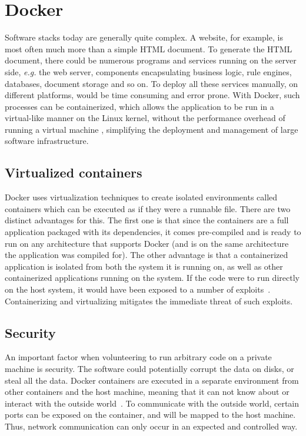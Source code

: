 \section{Docker}
Software stacks today are generally quite complex. A website, for example, is most often much more than a simple HTML document. To generate the HTML document, there could be numerous programs and services running on the server side, \textit{e.g.} the web server, components encapsulating business logic, rule engines, databases, document storage and so on. To deploy all these services manually, on different platforms, would be time consuming and error prone. With Docker, such processes can be containerized, which allows the application to be run in a virtual-like manner on the Linux kernel, without the performance overhead of running a virtual machine \cite{docker-about}, simplifying the deployment and management of large software infrastructure.

\subsection{Virtualized containers}
Docker uses virtualization techniques to create isolated environments called containers which can be executed as if they were a runnable file. There are two distinct advantages for this. The first one is that since the containers are a full application packaged with its dependencies, it comes pre-compiled and is ready to run on any architecture that supports Docker (and is on the same architecture the application was compiled for). The other advantage is that a containerized application is isolated from both the system it is running on, as well as other containerized applications running on the system. If the code were to run directly on the host system, it would have been exposed to a number of exploits~\cite{korpela:2012}. Containerizing and virtualizing mitigates the immediate threat of such exploits.

\subsection{Security}
An important factor when volunteering to run arbitrary code on a private machine is security. The software could potentially corrupt the data on disks, or steal all the data. 
Docker containers are executed in a separate environment from other containers and the host machine, meaning that it can not know about or interact with the outside world~\cite{docker-security}. To communicate with the outside world, certain ports can be exposed on the container, and will be mapped to the host machine. Thus, network communication can only occur in an expected and controlled way. 

